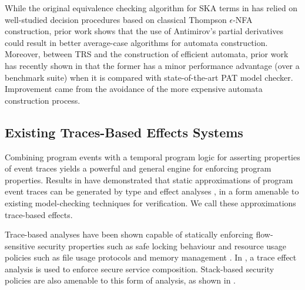 \documentclass[acmsmall,10pt,review]{acmart}
\newcommand{\code}[1]{{\tt{\ensuremath{\m{#1}}}}}
\newcommand{\m}{\mathit}
\begin{document}
While the original equivalence checking algorithm for SKA terms in \cite{prisacariu2010synchronous} has
relied on well-studied decision procedures based on classical Thompson \code{\epsilon}-NFA construction, prior work \cite{broda2015deciding}  shows that the use of Antimirov's partial derivatives
could result in better average-case algorithms for automata construction. 
Moreover, between TRS and the construction of efficient automata, prior work has recently shown in \cite{song2020automated} that the former has a minor performance advantage (over a benchmark suite) when it is compared with state-of-the-art PAT \cite{sun2009pat} model checker.
Improvement came from the avoidance of the more expensive automata construction process.



\subsection{Existing Traces-Based Effects Systems} 



Combining program events with a temporal program logic for asserting properties of event traces yields a powerful and general engine for enforcing program properties. Results in \cite{skalka2008types,skalka2004history,marriott2003resource} have demonstrated that static approximations of program event traces can be generated by type and effect analyses \cite{talpin1994type,amtoft1999type}, in a form amenable to existing model-checking techniques for verification. We call these approximations trace-based effects.

Trace-based analyses have been shown capable of statically enforcing flow-sensitive security properties such as safe locking behaviour \cite{foster2002flow} and resource usage policies such as file usage protocols and memory management \cite{marriott2003resource}. In \cite{bartoletti2005enforcing}, a trace effect analysis is used to enforce secure service composition. 
 Stack-based security policies are also amenable to this form of analysis, as shown in \cite{skalka2004history}. 
 

 
\end{document}

